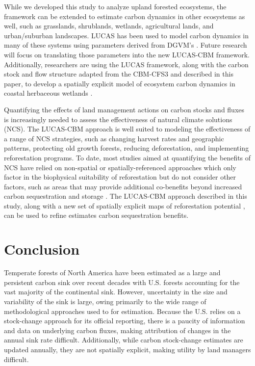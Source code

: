 \documentclass[
]{book}
\begin{document}
While we developed this study to analyze upland forested ecosystems, the framework can be extended to estimate carbon dynamics in other ecosystems as well, such as grasslands, shrublands, wetlands, agricultural lands, and urban/suburban landscapes. LUCAS has been used to model carbon dynamics in many of these systems using parameters derived from DGVM's \citep{sleeter2018effects}. Future research will focus on translating those parameters into the new LUCAS-CBM framework. Additionally, researchers are using the LUCAS framework, along with the carbon stock and flow structure adapted from the CBM-CFS3 and described in this paper, to develop a spatially explicit model of ecosystem carbon dynamics in coastal herbaceous wetlands \citep{stagg2020national}.

Quantifying the effects of land management actions on carbon stocks and fluxes is increasingly needed to assess the effectiveness of natural climate solutions (NCS). The LUCAS-CBM approach is well suited to modeling the effectiveness of a range of NCS strategies, such as changing harvest rates and geographic patterns, protecting old growth forests, reducing deforestation, and implementing reforestation programs. To date, most studies aimed at quantifying the benefits of NCS have relied on non-spatial or spatially-referenced approaches which only factor in the biophysical suitability of reforestation \citep[\citet{griscom2017natural}]{fargione2018natural} but do not consider other factors, such as areas that may provide additional co-benefits beyond increased carbon sequestration and storage \citep{cook2020lower}. The LUCAS-CBM approach described in this study, along with a new set of spatially explicit maps of reforestation potential \citep{cook2020lower}, can be used to refine estimates carbon sequestration benefits.

\hypertarget{conclusion}{%
\chapter{Conclusion}\label{conclusion}}

Temperate forests of North America have been estimated as a large and persistent carbon sink over recent decades with U.S. forests accounting for the vast majority of the continental sink. However, uncertainty in the size and variability of the sink is large, owing primarily to the wide range of methodological approaches used to for estimation. Because the U.S. relies on a stock-change approach for its official reporting, there is a paucity of information and data on underlying carbon fluxes, making attribution of changes in the annual sink rate difficult. Additionally, while carbon stock-change estimates are updated annually, they are not spatially explicit, making utility by land managers difficult.
\end{document}
